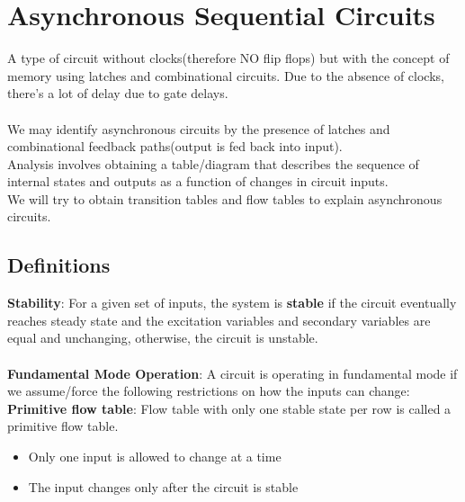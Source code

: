 \documentclass[12pt]{report}
\begin{document}
	\section{Asynchronous Sequential Circuits}
		A type of circuit without clocks(therefore NO flip flops) but with the concept of memory using latches and combinational circuits. Due to the absence of clocks, there's a lot of delay due to gate delays. \\
		\\
		We may identify asynchronous circuits by the presence of latches and combinational feedback paths(output is fed back into input). \\
		Analysis involves obtaining a table/diagram that describes the sequence of internal states and outputs as a function of changes in 	circuit inputs.\\
		We will try to obtain transition tables and flow tables to explain asynchronous circuits.
		\subsection{Definitions}
			\textbf{Stability}: For a given set of inputs, the system is \textbf{stable} if the circuit eventually reaches steady state and the excitation variables and secondary variables are equal and unchanging, otherwise, the circuit is unstable. \\
			\\
			\textbf{Fundamental Mode Operation}: A circuit is operating in fundamental mode if we assume/force the following restrictions on how the inputs can change:
			\\
			\textbf{Primitive flow table}: Flow table with only one stable state per row is called a primitive flow table.
			\begin{itemize}
				\item Only one input is allowed to change at a time
				\item The input changes only after the circuit is stable
			\end{itemize}
\end{document}
